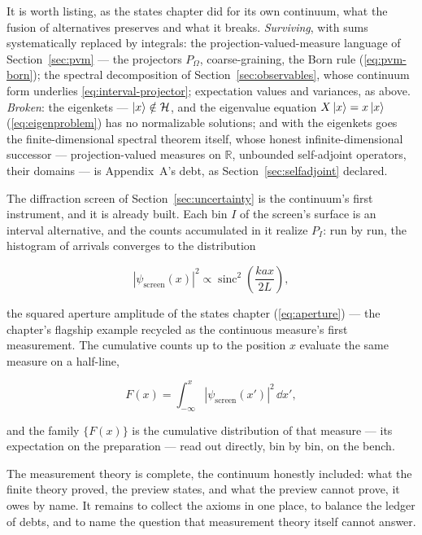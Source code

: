 It is worth listing, as the states chapter did for its own continuum, what the fusion of alternatives preserves and what it breaks. \emph{Surviving}, with sums systematically replaced by integrals: the projection-valued-measure language of Section~\ref{sec:pvm} --- the projectors $P_\Omega$, coarse-graining, the Born rule (\eqref{eq:pvm-born}); the spectral decomposition of Section~\ref{sec:observables}, whose continuum form underlies \eqref{eq:interval-projector}; expectation values and variances, as above. \emph{Broken}: the eigenkets --- $\ket{x} \notin \mathcal{H}$, and the eigenvalue equation $X\ket{x} = x\ket{x}$ (\eqref{eq:eigenproblem}) has no normalizable solutions; and with the eigenkets goes the finite-dimensional spectral theorem itself, whose honest infinite-dimensional successor --- projection-valued measures on $\mathbb{R}$, unbounded self-adjoint operators, their domains --- is Appendix~A's debt, as Section~\ref{sec:selfadjoint} declared.

The diffraction screen of Section~\ref{sec:uncertainty} is the continuum's first instrument, and it is already built. Each bin $I$ of the screen's surface is an interval alternative, and the counts accumulated in it realize $P_I$: run by run, the histogram of arrivals converges to the distribution
\begin{linenomath}
    \begin{equation}
        |\psi_{\mathrm{screen}}(x)|^2 \propto \operatorname{sinc}^2\!\left(\frac{kax}{2L}\right) ,
    \end{equation}
\end{linenomath}
the squared aperture amplitude of the states chapter (\eqref{eq:aperture}) --- the chapter's flagship example recycled as the continuous measure's first measurement. The cumulative counts up to the position $x$ evaluate the same measure on a half-line,
\begin{linenomath}
    \begin{equation}
        F(x) = \int_{-\infty}^{x} |\psi_{\mathrm{screen}}(x')|^2\,\dd x' ,
    \end{equation}
\end{linenomath}
and the family $\{F(x)\}$ is the cumulative distribution of that measure --- its expectation on the preparation --- read out directly, bin by bin, on the bench.

The measurement theory is complete, the continuum honestly included: what the finite theory proved, the preview states, and what the preview cannot prove, it owes by name. It remains to collect the axioms in one place, to balance the ledger of debts, and to name the question that measurement theory itself cannot answer.

